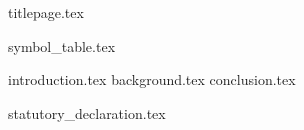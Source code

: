 \documentclass[10pt,fleqn,twoside,ngerman]{article}
\begin{document}
  {titlepage.tex}

  \setcounter{page}{0}
  {symbol_table.tex}
  \tableofcontents

  \cleardoublepage
  {introduction.tex}
  {background.tex}
  {conclusion.tex}

  \nocite{*}
  
  

  \cleardoublepage
  \appendix

  \cleardoublepage
  {statutory_declaration.tex}
\end{document}
